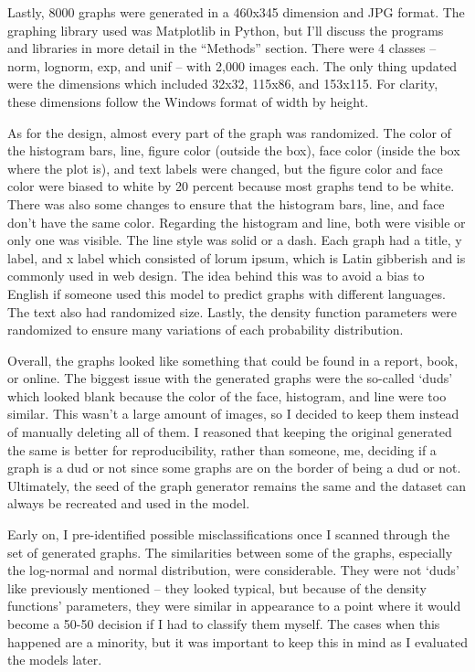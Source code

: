 \documentclass[12pt]{article}
\begin{document}
            Lastly, 8000 graphs were generated in a 460x345 dimension and JPG format. 
            The graphing library used was Matplotlib in Python, 
            but I’ll discuss the programs and libraries in more detail in the “Methods” section. 
            There were 4 classes -- norm, lognorm, exp, and unif -- with 2,000 images each. 
            The only thing updated were the dimensions which included 32x32, 115x86, and 153x115. 
            For clarity, these dimensions follow the Windows format of width by height.

            As for the design, almost every part of the graph was randomized. 
            The color of the histogram bars, line, figure color (outside the box), face color (inside the box where the plot is), 
            and text labels were changed, but the figure color and face color were biased to white by 20 percent 
            because most graphs tend to be white. There was also some changes to ensure 
            that the histogram bars, line, and face don’t have the same color. 
            Regarding the histogram and line, both were visible or only one was visible. 
            The line style was solid or a dash. Each graph had a title, y label, and x label which consisted of lorum ipsum, 
            which is Latin gibberish and is commonly used in web design. 
            The idea behind this was to avoid a bias to English if someone used this model to predict graphs with different languages. 
            The text also had randomized size. Lastly, the density function parameters were randomized 
            to ensure many variations of each probability distribution. 
            
            Overall, the graphs looked like something that could be found in a report, book, or online. 
            The biggest issue with the generated graphs were the so-called ‘duds’ which looked blank because the color of the face, 
            histogram, and line were too similar. This wasn’t a large amount of images, 
            so I decided to keep them instead of manually deleting all of them. 
            I reasoned that keeping the original generated the same is better for reproducibility, 
            rather than someone, me, deciding if a graph is a dud or not since some graphs are on the border of being a dud or not. 
            Ultimately, the seed of the graph generator remains the same and the dataset can always be recreated and used in the model.
            
            Early on, I pre-identified possible misclassifications once I scanned through the set of generated graphs. 
            The similarities between some of the graphs, especially the log-normal and normal distribution, were considerable. 
            They were not ‘duds’ like previously mentioned -- they looked typical, but because of the density functions’ parameters, 
            they were similar in appearance to a point where it would become a 50-50 decision if I had to classify them myself. 
            The cases when this happened are a minority, but it was important to keep this in mind as I evaluated the models later.
            
\end{document}
